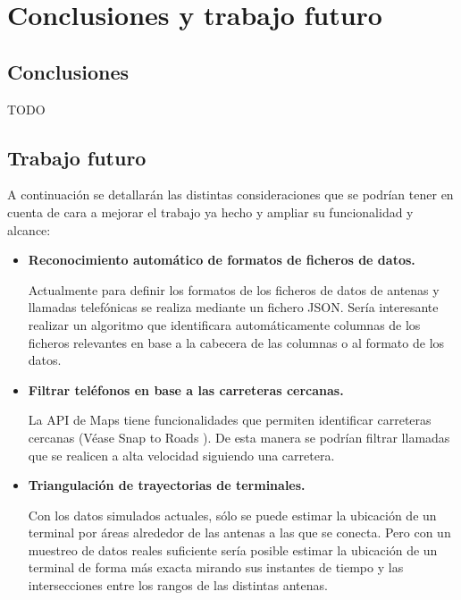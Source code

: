 \chapter{Conclusiones y trabajo futuro\label{CAP:CONCTRAB}}
  \section{Conclusiones\label{SEC:CONCLUSIONES}}
    TODO
  \section{Trabajo futuro\label{SEC:TRABAJO}}
    A continuación se detallarán las distintas consideraciones que se podrían tener en cuenta de cara a mejorar el trabajo ya hecho y ampliar su funcionalidad y alcance:
    
    \begin{itemize}
      \item \textbf{Reconocimiento automático de formatos de ficheros de datos.}
      
      Actualmente para definir los formatos de los ficheros de datos de antenas y llamadas telefónicas se realiza mediante un fichero JSON. 
      Sería interesante realizar un algoritmo que identificara automáticamente columnas de los ficheros relevantes en base a la cabecera de las columnas o al formato de los datos.
      
      \item \textbf{Filtrar teléfonos en base a las carreteras cercanas. }
      
      La API de Maps tiene funcionalidades que permiten identificar carreteras cercanas (Véase Snap to Roads \cite{snaproad}). De esta manera se podrían filtrar llamadas que se realicen a alta velocidad siguiendo una carretera.
      
      \item \textbf{Triangulación de trayectorias de terminales.}
      
      Con los datos simulados actuales, sólo se puede estimar la ubicación de un terminal por áreas alrededor de las antenas a las que se conecta.
      Pero con un muestreo de datos reales suficiente sería posible estimar la ubicación de un terminal de forma más exacta mirando sus instantes de tiempo y las intersecciones entre los rangos de las distintas antenas. 
    \end{itemize}